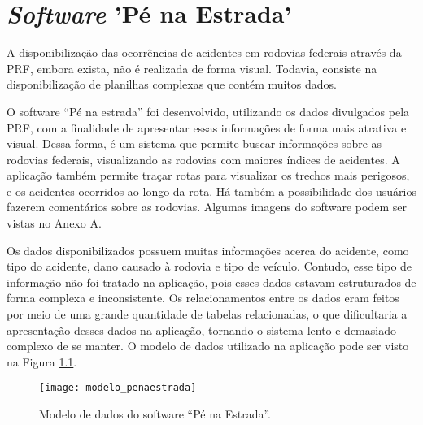 \chapter{\textit{Software} 'Pé na Estrada'}

A disponibilização das ocorrências de acidentes em rodovias federais através da PRF,
embora exista, não é realizada de forma visual. Todavia, consiste na disponibilização de
planilhas complexas que contém muitos dados.

O software “Pé na estrada” foi desenvolvido, utilizando os dados divulgados pela
PRF, com a finalidade de apresentar essas informações de forma mais atrativa e visual. Dessa
forma, é um sistema que permite buscar informações sobre as rodovias federais, visualizando
as rodovias com maiores índices de acidentes. A aplicação também permite traçar rotas para
visualizar os trechos mais perigosos, e os acidentes ocorridos ao longo da rota. Há também a
possibilidade dos usuários fazerem comentários sobre as rodovias. Algumas imagens do
software podem ser vistas no Anexo A.

Os dados disponibilizados possuem muitas informações acerca do acidente, como tipo
do acidente, dano causado à rodovia e tipo de veículo. Contudo, esse tipo de informação não
foi tratado na aplicação, pois esses dados estavam estruturados de forma complexa e
inconsistente. Os relacionamentos entre os dados eram feitos por meio de uma grande
quantidade de tabelas relacionadas, o que dificultaria a apresentação desses dados na
aplicação, tornando o sistema lento e demasiado complexo de se manter. O modelo de dados
utilizado na aplicação pode ser visto na Figura \ref{fig:modelo_penaestrada}.

\begin{figure}[!htb]
 \centering
 \texttt{[image: modelo\_penaestrada]}
 \caption[Modelo de dados do software “Pé na Estrada”]{Modelo de dados do software “Pé na Estrada”.}
 \label{fig:modelo_penaestrada}
\end{figure}

  
  
